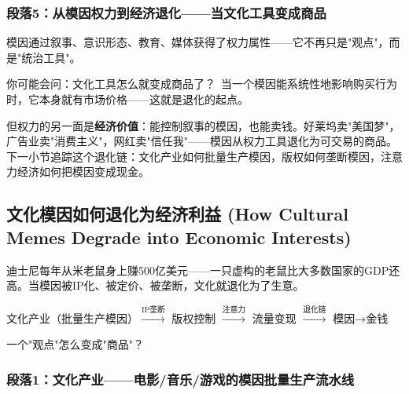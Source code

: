 \documentclass[../main.tex]{subfiles}
\begin{document}
	\subsubsection*{段落5：从模因权力到经济退化——当文化工具变成商品}

	模因通过叙事、意识形态、教育、媒体获得了权力属性——它不再只是"观点"，而是"统治工具"。

	\begin{tcolorbox}[colback=yellow!5, title=\textit{读者行为预测}]

		你可能会问：文化工具怎么就变成商品了？\ 当一个模因能系统性地影响购买行为时，它本身就有市场价格——这就是退化的起点。

	\end{tcolorbox}

但权力的另一面是\textbf{经济价值}：能控制叙事的模因，也能卖钱。好莱坞卖"美国梦"，广告业卖"消费主义"，网红卖"信任我"——模因从权力工具退化为可交易的商品。下一小节追踪这个退化链：文化产业如何批量生产模因，版权如何垄断模因，注意力经济如何把模因变成现金。

	\subsection{文化模因如何退化为经济利益 (How Cultural Memes Degrade into Economic Interests)}

	\begin{motivation}

		迪士尼每年从米老鼠身上赚500亿美元——一只虚构的老鼠比大多数国家的GDP还高。当模因被IP化、被定价、被垄断，文化就退化为了生意。

	\end{motivation}

	\begin{logicmap}

		文化产业（批量生产模因）$\xrightarrow{\text{IP垄断}}$ 版权控制 $\xrightarrow{\text{注意力}}$ 流量变现 $\xrightarrow{\text{退化链}}$ 模因→金钱

	\end{logicmap}

	\begin{questionbox}

		一个"观点"怎么变成"商品"？

	\end{questionbox}

	\subsubsection*{段落1：文化产业——电影/音乐/游戏的模因批量生产流水线}
\end{document}
